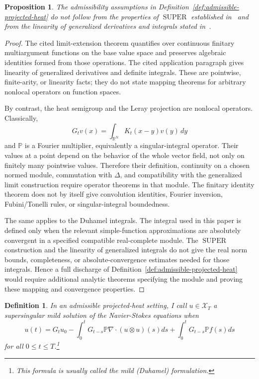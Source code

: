 \documentclass{amsart}
\newtheorem{prop}{Proposition}
\newtheorem{defn}{Definition}
\DeclareMathOperator{\SUPER}{SUPER}
\begin{document}
\begin{prop}\label{prop:super-does-not-prove-admissibility}
The admissibility assumptions in
Definition~\ref{def:admissible-projected-heat} do not follow from the
properties of $\SUPER$ established in~\cite[theorem~6, p.~10]{limit} and from
the linearity of generalized derivatives and integrals stated
in~\cite[p.~10]{limit}.
\end{prop}

\begin{proof}
The cited limit-extension theorem quantifies over continuous finitary
multiargument functions on the base value space and preserves algebraic
identities formed from those operations.  The cited application paragraph gives
linearity of generalized derivatives and definite integrals.  These are
pointwise, finite-arity, or linearity facts; they do not state mapping theorems
for arbitrary nonlocal operators on function spaces.

By contrast, the heat semigroup and the Leray projection are nonlocal
operators.  Classically,
\[
  G_t v(x)=\int_{\mathbb{R}^N}K_t(x-y)v(y)\,dy
\]
and $\mathbb{P}$ is a Fourier multiplier, equivalently a singular-integral
operator.  Their values at a point depend on the behavior of the whole vector
field, not only on finitely many pointwise values.  Therefore their definition,
continuity on a chosen normed module, commutation with $\Delta$, and
compatibility with the generalized limit construction require operator
theorems in that module.  The finitary identity theorem does not by itself give
convolution identities, Fourier inversion, Fubini/Tonelli rules, or
singular-integral boundedness.

The same applies to the Duhamel integrals.  The integral used in this paper is
defined only when the relevant simple-function approximations are absolutely
convergent in a specified compatible real-complete module.  The $\SUPER$
construction and the linearity of generalized integrals do not give the real
norm bounds, completeness, or absolute-convergence estimates needed for those
integrals.  Hence a full discharge of
Definition~\ref{def:admissible-projected-heat} would require additional
analytic theorems specifying the module and proving these mapping and
convergence properties.
\end{proof}

\begin{defn}
In an admissible projected-heat setting, I call $u\in\mathcal X_T$ a
supersingular mild solution of the Na\-vi\-er-Sto\-kes equations when
\[
u(t) = G_t u_0 - \int_0^t G_{t-s} \mathbb{P} \nabla \cdot (u \otimes u)(s) ds
+ \int_0^t G_{t-s} \mathbb{P} f(s) ds
\]
for all $0\leq t\leq T$.\footnote{This formula is usually called the
\emph{mild (Duhamel) formulation}.}
\end{defn}
\end{document}
